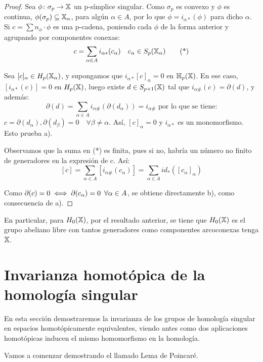 \begin{proof}
  Sea $\phi \colon \sigma_p \to {\mathbb X}$ un p-símplice singular. Como $\sigma_p$ es convexo y $\phi$ es continua, $\phi(\sigma_p) \subseteq {\mathbb X}_\alpha$, para algún
  $\alpha \in A$, por lo que $\phi = i_{\alpha*}(\phi)$ para dicho $\alpha$. \\
  Si $c = \sum n_\phi \cdot \phi$ es una p-cadena, poniendo cada $\phi$ de la forma anterior y agrupando por componentes conexas:
  \begin{equation}
    c = \sum\limits_{\alpha \in A} i_{\alpha*}(c_\alpha) \quad c_\alpha \in S_p({\mathbb X}_\alpha)  \tag{*}
  \end{equation}

  Sea $[c]_\alpha \in H_p({\mathbb X}_\alpha)$, y supongamos que $i_{\alpha*}[c]_\alpha = 0$ en ${\mathbb H}_p({\mathbb X})$. En ese caso, $[i_{\alpha*}(c)] = 0$ en $H_p({\mathbb X})$,
  luego existe $d \in S_{p+1}({\mathbb X})$ tal que $i_{\alpha\#}(c) = \partial(d)$, y además:
  \[\partial(d) = \sum\limits_{\alpha \in A} i_{\alpha\#}(\partial(d_\alpha)) = i_{\alpha\#} \text{ por lo que se tiene:} \]
  $c = \partial(d_\alpha), \partial(d_\beta) = 0 \quad \forall \beta \neq \alpha$. Así, $[c]_\alpha = 0$ y $i_{\alpha*}$ es un monomorfismo.
  Esto prueba a).

  Observamos que la suma en (*) es finita, pues si no, habría un número no finito de generadores en la expresión de c. Así:
  \[  [c] = \sum\limits_{\alpha \in A} [i_{\alpha\#}(c_\alpha)] =  \sum\limits_{\alpha \in A} id_*([c_\alpha]_\alpha)\]

  Como $\partial(c) = 0 \iff \partial(c_\alpha) = 0 \hspace{0.5em} \forall \alpha \in A$, se obtiene directamente b), como consecuencia de a).
\end{proof}

En particular, para $H_0({\mathbb X})$, por el resultado anterior, se tiene que $H_0({\mathbb X})$ es el grupo abeliano libre con tantos generadores como
componentes arcoconexas tenga ${\mathbb X}$.

\section{Invarianza homotópica de la homología singular}

En esta sección demostraremos la invarianza de los grupos de homología singular en espacios homotópicamente equivalentes, viendo antes como
dos aplicaciones homotópicas inducen el mismo homomorfismo en la homología.

Vamos a comenzar demostrando el llamado Lema de Poincaré.

